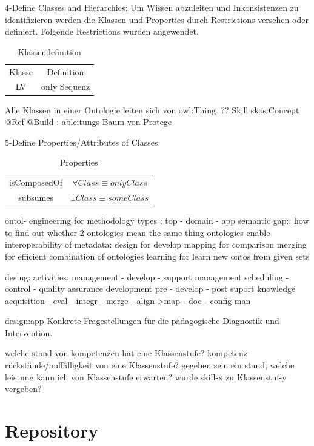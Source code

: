 \documentclass[
12pt,
english,
ngerman,
headsepline,
twoside,
openright,
numbers=noenddot,version=first
]{scrreprt}
\providecommand{\tabularnewline}{\\}
\begin{document}
4-Define Classes and Hierarchies:
Um Wissen abzuleiten und Inkonsistenzen zu identifizieren werden die Klassen und Properties durch Restrictions versehen oder definiert. Folgende Restrictions wurden angewendet. 
\begin{table}[H]
	\caption{Klassendefinition}
	
	\noindent \centering{}\begin{tabular}{cc}
		\hline 
		\noalign{\vskip\doublerulesep}
		Klasse & Definition \tabularnewline[\doublerulesep]
		\noalign{\vskip\doublerulesep}
		LV & only Sequenz \tabularnewline[\doublerulesep]
	\end{tabular}
\end{table}


Alle Klassen in einer Ontologie leiten sich von \glqq owl:Thing\grqq. ?? 
Skill skos:Concept @Ref
@Build : ableitungs Baum von Protege

5-Define Properties/Attributes of Classes: 
\begin{table}[H]
	\caption{Properties}
	
	\noindent \centering{}\begin{tabular}{cc}
		\hline 
		\noalign{\vskip\doublerulesep}
		isComposedOf & $\forall{Class} \equiv only Class$ \tabularnewline[\doublerulesep]
		\noalign{\vskip\doublerulesep}
		subsumes & $\exists{Class} \equiv some Class$ \tabularnewline[\doublerulesep]
	\end{tabular}
\end{table}


ontol- engineering for methodology 
types : top - domain - app
semantic gap:: how to find out whether 2 ontologies mean the same thing
ontologies enable interoperability of metadata: 
design for develop
mapping for comparison
merging for efficient combination of ontologies
learning for learn new ontos from given sets

desing: 
activities: management - develop - support
management
scheduling - control - quality assurance
development
pre - develop - post
suport
knowledge acquisition - eval - integr - merge - align->map - doc - config man

design:app
Konkrete Fragestellungen für die pädagogische Diagnostik und Intervention.

welche stand von kompetenzen hat eine Klassenstufe?
kompetenz-rückstände/auffälligkeit von eine Klassenstufe?
gegeben sein ein stand, welche leistung kann ich von Klassenstufe erwarten?
wurde skill-x zu Klassenstuf-y vergeben? 

\section{Repository}
\end{document}
